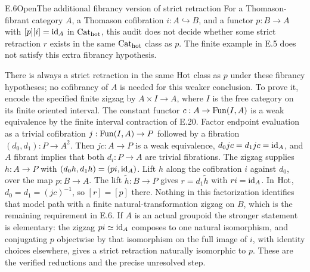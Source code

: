 \begin{claim}{E.6}{Open}{The additional fibrancy version of strict retraction}
For a Thomason-fibrant category $A$, a Thomason cofibration $i:A\hookrightarrow B$, and a functor $p:B\to A$ with $[p][i]=\mathrm{id}_A$ in ${\mathrm{Cat}_{\mathrm{hot}}}$, this audit does not decide whether some strict retraction $r$ exists in the same ${\mathrm{Cat}_{\mathrm{hot}}}$ class as $p$. The finite example in E.5 does not satisfy this extra fibrancy hypothesis.
\end{claim}
There is always a strict retraction in the same $\mathrm{Hot}$ class as $p$ under these fibrancy hypotheses; no cofibrancy of $A$ is needed for this weaker conclusion. To prove it, encode the specified finite zigzag by $A\times I\to A$, where $I$ is the free category on its finite oriented interval. The constant functor $c:A\to\operatorname{Fun}(I,A)$ is a weak equivalence by the finite interval contraction of E.20. Factor endpoint evaluation as a trivial cofibration $j:\operatorname{Fun}(I,A)\to P$ followed by a fibration $(d_0,d_1):P\to A^2$. Then $jc:A\to P$ is a weak equivalence, $d_0jc=d_1jc=\mathrm{id}_A$, and $A$ fibrant implies that both $d_i:P\to A$ are trivial fibrations. The zigzag supplies $h:A\to P$ with $(d_0h,d_1h)=(pi,\mathrm{id}_A)$. Lift $h$ along the cofibration $i$ against $d_0$, over the map $p:B\to A$. The lift $\widetilde h:B\to P$ gives $r=d_1\widetilde h$ with $ri=\mathrm{id}_A$. In $\mathrm{Hot}$, $d_0=d_1=(jc)^{-1}$, so $[r]=[p]$ there. Nothing in this factorization identifies that model path with a finite natural-transformation zigzag on $B$, which is the remaining requirement in E.6. If $A$ is an actual groupoid the stronger statement is elementary: the zigzag $pi\simeq\mathrm{id}_A$ composes to one natural isomorphism, and conjugating $p$ objectwise by that isomorphism on the full image of $i$, with identity choices elsewhere, gives a strict retraction naturally isomorphic to $p$. These are the verified reductions and the precise unresolved step.

